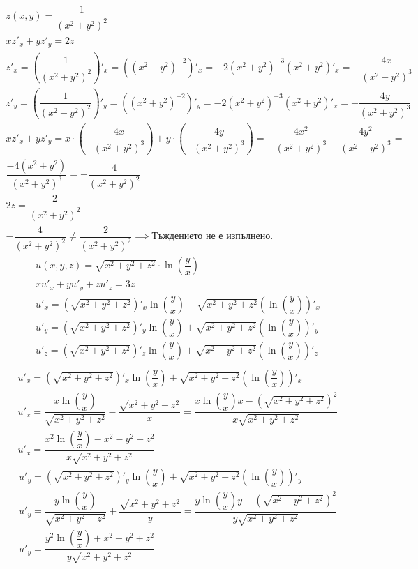 \documentclass[a4paper,fleqn,12pt]{article}
\theoremstyle{definition}
\begin{document}
\begin{gather*}
z(x,y) = \dfrac{1}{(x^2+y^2)^2} \\
xz'_x +yz'_y = 2z \\
z'_x = \left( \dfrac{1}{(x^2+y^2)^2}\right)'_x = \left((x^2+y^2)^{-2}\right)'_x = -2(x^2+y^2)^{-3}(x^2+y^2)'_x =-\dfrac{4x}{(x^2+y^2)^3}\\
z'_y = \left( \dfrac{1}{(x^2+y^2)^2}\right)'_y = \left((x^2+y^2)^{-2}\right)'_y = -2(x^2+y^2)^{-3}(x^2+y^2)'_x =-\dfrac{4y}{(x^2+y^2)^3}\\
xz'_x +yz'_y = x \cdot \left( - \dfrac{4x}{(x^2+y^2)^3} \right)+ y \cdot \left( - \dfrac{4y}{(x^2+y^2)^3}\right) = -\dfrac{4x^2}{(x^2+y^2)^3} - \dfrac{4y^2}{(x^2+y^2)^3} = \\
\dfrac{-4(x^2+y^2)}{(x^2+y^2)^3} = -\dfrac{4}{(x^2+y^2)^2}\\
2z = \dfrac{2}{(x^2+y^2)^2}\\
-\dfrac{4}{(x^2+y^2)^2} \neq  \dfrac{2}{(x^2+y^2)^2} \implies \text{Тъждението не е изпълнено.}
\end{gather*}
\begin{gather*}
u(x,y,z) = \sqrt{x^2+y^2+z^2}\cdot \ln{\left( \dfrac{y}{x}\right)}\\
xu'_x + yu'_y + zu'_z = 3z \\
u'_x = \left(\sqrt{x^2+y^2+z^2}\right)'_x \ln{\left( \dfrac{y}{x}\right)} + \sqrt{x^2+y^2+z^2}\left( \ln{\left( \dfrac{y}{x}\right)}\right)'_x \\
u'_y = \left(\sqrt{x^2+y^2+z^2}\right)'_y \ln{\left( \dfrac{y}{x}\right)} + \sqrt{x^2+y^2+z^2}\left( \ln{\left( \dfrac{y}{x}\right)}\right)'_y \\
u'_z = \left(\sqrt{x^2+y^2+z^2}\right)'_z\ln{\left( \dfrac{y}{x}\right)} + \sqrt{x^2+y^2+z^2}\left( \ln{\left( \dfrac{y}{x}\right)}\right)'_z \\
\end{gather*}
\begin{gather*}
u'_x = \left(\sqrt{x^2+y^2+z^2}\right)'_x \ln{\left( \dfrac{y}{x}\right)} + \sqrt{x^2+y^2+z^2}\left( \ln{\left( \dfrac{y}{x}\right)}\right)'_x \\
u'_x = \dfrac{x\ln{\left( \dfrac{y}{x}\right)}}{\sqrt{x^2+y^2+z^2}} - \dfrac{\sqrt{x^2+y^2+z^2}}{x} = \dfrac{x\ln{\left( \dfrac{y}{x}\right)}x - \left(\sqrt{x^2+y^2+z^2}\right)^2}{x\sqrt{x^2+y^2+z^2}}\\
u'_x = \dfrac{x^2\ln{\left( \dfrac{y}{x}\right)} - x^2- y^2- z^2}{x\sqrt{x^2+y^2+z^2}}
\end{gather*} 
\begin{gather*}
u'_y = \left(\sqrt{x^2+y^2+z^2}\right)'_y \ln{\left( \dfrac{y}{x}\right)} + \sqrt{x^2+y^2+z^2}\left( \ln{\left( \dfrac{y}{x}\right)}\right)'_y \\
u'_y = \dfrac{y\ln{\left( \dfrac{y}{x}\right)}}{\sqrt{x^2+y^2+z^2}} + \dfrac{\sqrt{x^2+y^2+z^2}}{y} = \dfrac{y\ln{\left( \dfrac{y}{x}\right)}y + \left(\sqrt{x^2+y^2+z^2}\right)^2}{y\sqrt{x^2+y^2+z^2}}\\
u'_y = \dfrac{y^2\ln{\left( \dfrac{y}{x}\right)} + x^2 + y^2 + z^2}{y\sqrt{x^2+y^2+z^2}}
\end{gather*}
\end{document}
